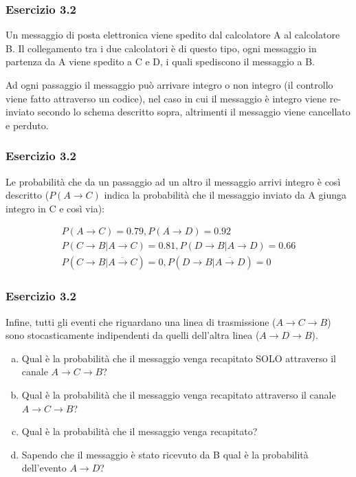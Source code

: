 \documentclass{beamer}
\begin{document}
\begin{frame}[fragile]
	\frametitle{Esercizio 3.2}
	\begin{exercise}
		Un messaggio di posta elettronica viene spedito dal calcolatore A al calcolatore B. Il collegamento tra i due calcolatori è di questo tipo, ogni messaggio in partenza da A viene spedito a C e D, i quali spediscono il messaggio a B.

		Ad ogni passaggio il messaggio può arrivare integro o non integro (il controllo viene fatto attraverso un codice), nel caso in cui il messaggio è integro viene re-inviato secondo lo schema descritto sopra, altrimenti il messaggio viene cancellato e perduto.
	\end{exercise}
\end{frame}

\begin{frame}[fragile]
	\frametitle{Esercizio 3.2}
	\begin{exercise}
		Le probabilità che da un passaggio ad un altro il messaggio arrivi integro è così descritto ($P(A \rightarrow C)$ indica la probabilità che il messaggio inviato da A giunga integro in C e così via):

		\begin{gather*}
			P(A \rightarrow C) = 0.79, P(A \rightarrow D) = 0.92 \\
			P(C \rightarrow B|A \rightarrow C) = 0.81, P(D \rightarrow B|A \rightarrow D) = 0.66 \\
			P(C \rightarrow B|\overline{A \rightarrow C}) = 0, P(D \rightarrow B|\overline{A \rightarrow D}) = 0
		\end{gather*}
	\end{exercise}
\end{frame}

\begin{frame}[fragile]
	\frametitle{Esercizio 3.2}
	\begin{exercise}
		Infine, tutti gli eventi che riguardano una linea di trasmissione ($A \rightarrow C \rightarrow B$) sono stocasticamente indipendenti da quelli dell'altra linea ($A \rightarrow D \rightarrow B$).
		\begin{enumerate}[(a)]
			\item Qual è la probabilità che il messaggio venga recapitato SOLO attraverso il canale $A \rightarrow C \rightarrow B$?
			\item Qual è la probabilità che il messaggio venga recapitato attraverso il canale $A \rightarrow C \rightarrow B$?
			\item Qual è la probabilità che il messaggio venga recapitato?
			\item Sapendo che il messaggio è stato ricevuto da B qual è la probabilità dell'evento $A \rightarrow D$?
		\end{enumerate}
	\end{exercise}
\end{frame}
\end{document}
